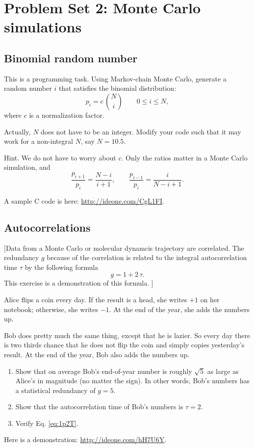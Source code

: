 \documentclass[12pt]{article}
\begin{document}
\section{Problem Set 2: Monte Carlo simulations}

\subsection{Binomial random number}



This is a programming task.
%
Using Markov-chain Monte Carlo,
generate a random number $i$ that satisfies the binomial distribution:
$$
p_i = c \, {N \choose i}
\qquad
0 \le i \le N
,
$$
where $c$ is a normalization factor.

Actually, $N$ does not have to be an integer.
Modify your code such that it may work for a non-integral $N$,
say $N = 10.5$.

Hint. We do not have to worry about $c$.
Only the ratios matter in a Monte Carlo simulation, and
$$
\frac{ p_{i+1} } { p_i } = \frac{ N - i } { i + 1 },
\qquad
\frac{ p_{i-1} } { p_i } = \frac{ i } { N - i + 1}.
$$

A sample C code is here: \url{http://ideone.com/CgL1FI}.



\subsection{Autocorrelations}

[Data from a Monte Carlo or molecular dynamcis trajectory are correlated.
  The redundancy $g$ because of the correlation
  is related to the integral autocorrelation time $\tau$
  by the following formula
  \begin{equation}
    g = 1 + 2 \, \tau.
  \label{eq:1p2T}
  \end{equation}
  This exercise is a demonstration of this formula.
]

Alice flips a coin every day.
%
If the result is a head, she writes $+1$ on her notebook;
otherwise, she writes $-1$.
%
At the end of the year, she adds the numbers up.

Bob does pretty much the same thing, except that he is lazier.
%
So every day there is two thirds chance that he does not flip the coin
and simply copies yesterday's result.
%
At the end of the year, Bob also adds the numbers up.

\begin{enumerate}
  \item
  Show that on average Bob's end-of-year number
  is roughly $\sqrt 5$ as large as Alice's
  in magnitude (no matter the sign).
  In other words, Bob's numbers has
  a statistical redundancy of $g = 5$.

  \item
  Show that the autocorrelation time of Bob's numbers
  is $\tau = 2$.

  \item
  Verify Eq. \eqref{eq:1p2T}.
\end{enumerate}

Here is a demonstration:
\url{http://ideone.com/hH7U6Y}.
\end{document}
